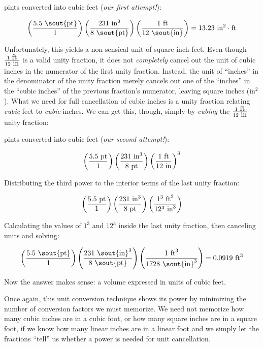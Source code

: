 \vskip 10pt

 pints converted into cubic feet (\textit{our first attempt!}):

$$\left({5.5 \hbox{ \sout{pt}} \over 1}\right) \left({231 \hbox{ in}^3 \over 8 \hbox{ \sout{pt}}}\right) \left(1 \hbox{ ft} \over 12 \hbox{ \sout{in}}\right) = 13.23 \hbox{ in}^2 \cdot \hbox{ft}$$

\vskip 10pt

Unfortunately, this yields a non-sensical unit of square inch-feet.  Even though ${1 \hbox{ ft} \over 12 \hbox{ in}}$ is a valid unity fraction, it does not \textit{completely} cancel out the unit of cubic inches in the numerator of the first unity fraction.  Instead, the unit of ``inches'' in the denominator of the unity fraction merely cancels out one of the ``inches'' in the ``cubic inches'' of the previous fraction's numerator, leaving square inches (in$^{2}$).  What we need for full cancellation of cubic inches is a unity fraction relating \textit{cubic} feet to \textit{cubic} inches.  We can get this, though, simply by \textit{cubing} the ${1 \hbox{ ft} \over 12 \hbox{ in}}$ unity fraction:

\vskip 10pt

 pints converted into cubic feet (\textit{our second attempt!}):

$$\left({5.5 \hbox{ pt} \over 1}\right) \left({231 \hbox{ in}^3 \over 8 \hbox{ pt}}\right) \left(1 \hbox{ ft} \over 12 \hbox{ in}\right)^3$$

Distributing the third power to the interior terms of the last unity fraction:

$$\left({5.5 \hbox{ pt} \over 1}\right) \left({231 \hbox{ in}^3 \over 8 \hbox{ pt}}\right) \left(1^3 \hbox{ ft}^3 \over 12^3 \hbox{ in}^3\right)$$

Calculating the values of $1^3$ and $12^3$ inside the last unity fraction, then canceling units and solving:

$$\left({5.5 \hbox{ \sout{pt}} \over 1}\right) \left({231 \hbox{ \sout{in}}^3 \over 8 \hbox{ \sout{pt}}}\right) \left(1 \hbox{ ft}^3 \over 1728 \hbox{ \sout{in}}^3\right) = 0.0919 \hbox{ ft}^3$$

Now the answer makes sense: a volume expressed in units of cubic feet.

\vskip 10pt

\filbreak

Once again, this unit conversion technique shows its power by minimizing the number of conversion factors we must memorize.  We need not memorize how many cubic inches are in a cubic foot, or how many square inches are in a square foot, if we know how many linear inches are in a linear foot and we simply let the fractions ``tell'' us whether a power is needed for unit cancellation.

